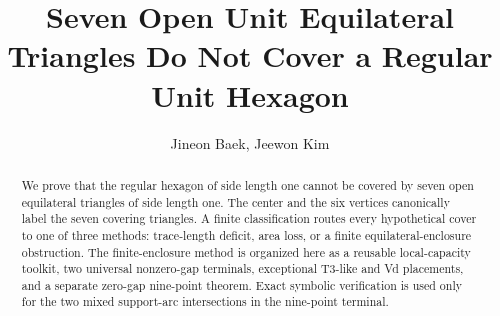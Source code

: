 \documentclass{amsart}
\title[Seven triangles do not cover the unit hexagon]
{Seven Open Unit Equilateral Triangles Do Not Cover a Regular Unit Hexagon}
\author{Jineon Baek, Jeewon Kim}
\theoremstyle{definition}
\theoremstyle{remark}
\begin{document}
\raggedbottom
\setcounter{secnumdepth}{3}

\begin{abstract}
We prove that the regular hexagon of side length one cannot be covered by
seven open equilateral triangles of side length one.  The center and the six
vertices canonically label the seven covering triangles.  A finite
classification routes every hypothetical cover to one of three methods:
trace-length deficit, area loss, or a finite equilateral-enclosure
obstruction.  The finite-enclosure method is organized here as a reusable
local-capacity toolkit, two universal nonzero-gap terminals, exceptional
T3-like and Vd placements, and a separate zero-gap nine-point theorem.
Exact symbolic verification is used only for the two mixed support-arc
intersections in the nine-point terminal.
\end{abstract}

\maketitle
\setcounter{tocdepth}{2}
\tableofcontents








\label{page:proof-body-end}

\clearpage
\appendix



\end{document}
